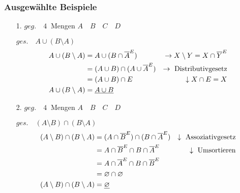             \subsubsection{Ausgewählte Beispiele}
                \begin{itemize}
                    \item[1.] $geg.\quad 4~$ Mengen $A \quad B \quad C \quad D$
                    \item[]   $ges.\quad A \cup (B \setminus A)$
                        \begin{align*}
                            A \cup (B \setminus A) & =A \cup (B \cap \overline{A}^E) & \rightarrow X \setminus Y = X \cap \overline{Y}^E \\
                                                   & =(A \cup B) \cap (A \cup \overline{A}^E)& \rightarrow \text{~Distributivgesetz}\\
                                                   & =(A \cup B) \cap E & \downarrow X \cap E = X \\
                            A \cup (B \setminus A) & =\underline{A \cup B} &\\
                        \end{align*}
                    \item[2.] $geg.\quad 4~$ Mengen $A \quad B \quad C \quad D$  
                    \item[]   $ges.\quad (A \setminus B) \cap (B \setminus A)$ \begin{align*}
                                (A \setminus B) \cap (B \setminus A) & = (A \cap \overline{B}^E) \cap (B \cap \overline{A}^E) & \downarrow \text{~Assoziativgesetz} \\
                                & = A \cap \overline{B}^E \cap B \cap \overline{A}^E & \downarrow \text{~Umsortieren} \\
                                & = A \cap \overline{A}^E \cap B \cap \overline{B}^E & \\
                                & = \varnothing \cap \varnothing & \\
                                (A \setminus B) \cap (B \setminus A) & = \underline{\varnothing} & \\
                                \end{align*}
                \end{itemize}
                      
